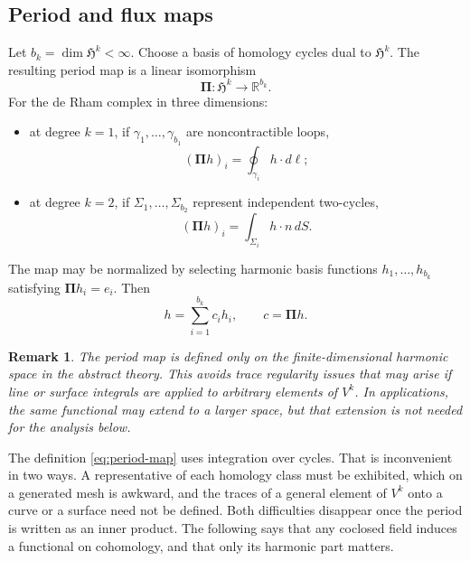 \documentclass{article}
\newtheorem{remark}{Remark}[section]
\newcommand{\R} {\mathbb R}
\newcommand{\HH}{\mathfrak H}
\newcommand{\Piop}{\boldsymbol\Pi}
\begin{document}
\subsection{Period and flux maps}\label{Pmaps}
Let $b_k=\dim\HH^k<\infty$. Choose a basis of homology cycles dual to $\HH^k$. The resulting period map is a linear isomorphism
\begin{equation}\label{eq:period-map}
 \Piop:\HH^k\to\R^{b_k}.
\end{equation}
For the de Rham complex in three dimensions:
\begin{itemize}
\item at degree $k=1$, if $\gamma_1,\dots,\gamma_{b_1}$ are noncontractible loops,
\[
 (\Piop h)_i=\oint_{\gamma_i} h\cdot d\ell;
\]
\item at degree $k=2$, if $\Sigma_1,\dots,\Sigma_{b_2}$ represent independent two-cycles,
\[
 (\Piop h)_i=\int_{\Sigma_i} h\cdot n\,dS.
\]
\end{itemize}
The map may be normalized by selecting harmonic basis functions $h_1,\dots,h_{b_k}$ satisfying $\Piop h_i=e_i$. Then
\begin{equation}
 h=\sum_{i=1}^{b_k}c_i h_i,
 \qquad c=\Piop h.
\end{equation}

\begin{remark}
The period map is defined only on the 
finite-dimensional harmonic space in the abstract theory. This avoids trace regularity issues that may arise if line or surface integrals are applied to arbitrary elements of $V^k$. In applications, the same functional may extend to a larger space, but that extension is not needed for the analysis below.
\end{remark}

The definition \eqref{eq:period-map} uses integration over cycles. That is
inconvenient in two ways. A representative of each homology class must be
exhibited, which on a generated mesh is awkward, and the traces of a general
element of $V^k$ onto a curve or a surface need not be defined. Both
difficulties disappear once the period is written as an inner product. The
following says that any coclosed field induces a functional on cohomology, and
that only its harmonic part matters.
\end{document}
